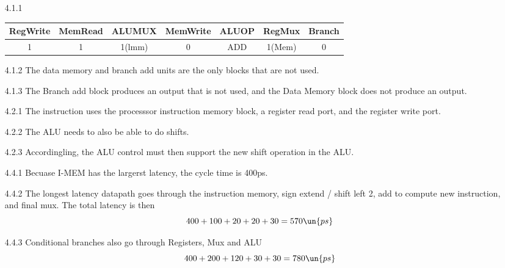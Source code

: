 \documentclass[]{3330hw}
\begin{document}
\maketitle

\begin{itemize}
    \item [4.1.1] ~
		\begin{table}[h!]
		\centering
		\begin{tabular}{@{}ccccccc@{}}
		\toprule
		RegWrite & MemRead & ALUMUX & MemWrite & ALUOP & RegMux & Branch \\ \midrule
		1        & 1       & 1(lmm) & 0        & ADD   & 1(Mem) & 0      \\ \bottomrule
		\end{tabular}
		\end{table}	
	
	\item [4.1.2] The data memory and branch add units are the only blocks that are not used.

	\item [4.1.3] The Branch add block produces an output that is not used, and the Data Memory block does not produce an output.
	
	\item [4.2.1] The instruction uses the processsor instruction memory block, a register read port, and the register write port.

	\item [4.2.2] The ALU needs to also be able to do shifts.

	\item [4.2.3] Accordingling, the ALU control must then support the new shift operation in the ALU.

	\item [4.4.1] Becuase I-MEM has the largerst latency, the cycle time is 400ps.

	\item [4.4.2] The longest latency datapath goes through the instruction memory, sign extend / shift left 2, add to compute new instruction, and final mux. The total latency is then
	\[
		400 + 100 + 20 + 20 + 30 = 570 \un{ps}
	\]

	\item [4.4.3] Conditional branches also go through Registers, Mux and ALU
	\[
		400 + 200 + 120 + 30 + 30 = 780 \un{ps}
	\]
	
\end{itemize}
\end{document}
